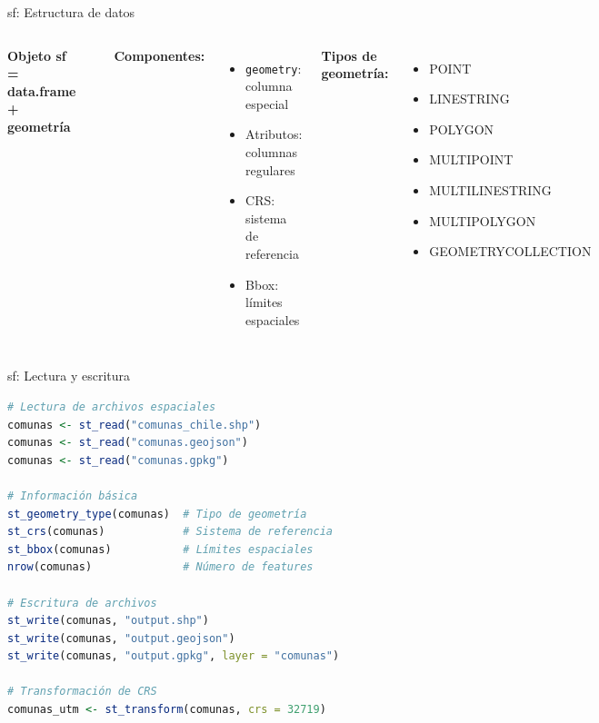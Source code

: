\documentclass[10pt,aspectratio=169]{beamer}
\begin{document}
\begin{frame}[fragile]{sf: Estructura de datos}
    \begin{columns}[T]
        \textbf{Objeto sf = data.frame + geometría}
        \begin{lstlisting}[language=R]
# Crear puntos desde coordenadas
df <- data.frame(
  nombre = c("USACH", "UC", "U.Chile"),
  lat = c(-33.449, -33.441, -33.442),
  lon = c(-70.681, -70.640, -70.650)
)

# Convertir a sf
puntos_sf <- st_as_sf(df, 
  coords = c("lon", "lat"),
  crs = 4326)

# Ver estructura
print(puntos_sf)
class(puntos_sf)
        \end{lstlisting}
        
        \textbf{Componentes:}
        \begin{itemize}
            \item \texttt{geometry}: columna especial
            \item Atributos: columnas regulares
            \item CRS: sistema de referencia
            \item Bbox: límites espaciales
        \end{itemize}
        
        \vspace{0.3cm}
        \textbf{Tipos de geometría:}
        \begin{itemize}
            \item POINT
            \item LINESTRING
            \item POLYGON
            \item MULTIPOINT
            \item MULTILINESTRING
            \item MULTIPOLYGON
            \item GEOMETRYCOLLECTION
        \end{itemize}
    \end{columns}
\end{frame}

\begin{frame}[fragile]{sf: Lectura y escritura}
    \begin{lstlisting}[language=R]
# Lectura de archivos espaciales
comunas <- st_read("comunas_chile.shp")
comunas <- st_read("comunas.geojson")
comunas <- st_read("comunas.gpkg")

# Información básica
st_geometry_type(comunas)  # Tipo de geometría
st_crs(comunas)            # Sistema de referencia
st_bbox(comunas)           # Límites espaciales
nrow(comunas)              # Número de features

# Escritura de archivos
st_write(comunas, "output.shp")
st_write(comunas, "output.geojson")
st_write(comunas, "output.gpkg", layer = "comunas")

# Transformación de CRS
comunas_utm <- st_transform(comunas, crs = 32719)
    \end{lstlisting}
\end{frame}
\end{document}
